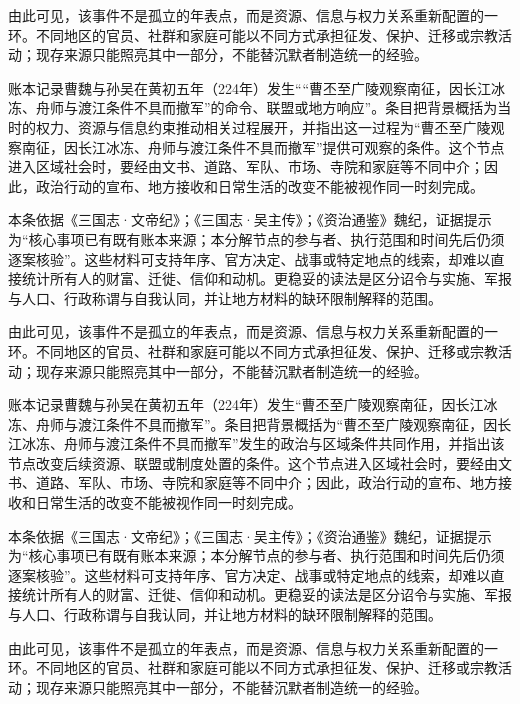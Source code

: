 由此可见，该事件不是孤立的年表点，而是资源、信息与权力关系重新配置的一环。不同地区的官员、社群和家庭可能以不同方式承担征发、保护、迁移或宗教活动；现存来源只能照亮其中一部分，不能替沉默者制造统一的经验。

账本记录曹魏与孙吴在黄初五年（224年）发生““曹丕至广陵观察南征，因长江冰冻、舟师与渡江条件不具而撤军”的命令、联盟或地方响应”。条目把背景概括为当时的权力、资源与信息约束推动相关过程展开，并指出这一过程为“曹丕至广陵观察南征，因长江冰冻、舟师与渡江条件不具而撤军”提供可观察的条件。这个节点进入区域社会时，要经由文书、道路、军队、市场、寺院和家庭等不同中介；因此，政治行动的宣布、地方接收和日常生活的改变不能被视作同一时刻完成。

本条依据《三国志·文帝纪》；《三国志·吴主传》；《资治通鉴》魏纪，证据提示为“核心事项已有既有账本来源；本分解节点的参与者、执行范围和时间先后仍须逐案核验”。这些材料可支持年序、官方决定、战事或特定地点的线索，却难以直接统计所有人的财富、迁徙、信仰和动机。更稳妥的读法是区分诏令与实施、军报与人口、行政称谓与自我认同，并让地方材料的缺环限制解释的范围。

由此可见，该事件不是孤立的年表点，而是资源、信息与权力关系重新配置的一环。不同地区的官员、社群和家庭可能以不同方式承担征发、保护、迁移或宗教活动；现存来源只能照亮其中一部分，不能替沉默者制造统一的经验。

账本记录曹魏与孙吴在黄初五年（224年）发生“曹丕至广陵观察南征，因长江冰冻、舟师与渡江条件不具而撤军”。条目把背景概括为“曹丕至广陵观察南征，因长江冰冻、舟师与渡江条件不具而撤军”发生的政治与区域条件共同作用，并指出该节点改变后续资源、联盟或制度处置的条件。这个节点进入区域社会时，要经由文书、道路、军队、市场、寺院和家庭等不同中介；因此，政治行动的宣布、地方接收和日常生活的改变不能被视作同一时刻完成。

本条依据《三国志·文帝纪》；《三国志·吴主传》；《资治通鉴》魏纪，证据提示为“核心事项已有既有账本来源；本分解节点的参与者、执行范围和时间先后仍须逐案核验”。这些材料可支持年序、官方决定、战事或特定地点的线索，却难以直接统计所有人的财富、迁徙、信仰和动机。更稳妥的读法是区分诏令与实施、军报与人口、行政称谓与自我认同，并让地方材料的缺环限制解释的范围。

由此可见，该事件不是孤立的年表点，而是资源、信息与权力关系重新配置的一环。不同地区的官员、社群和家庭可能以不同方式承担征发、保护、迁移或宗教活动；现存来源只能照亮其中一部分，不能替沉默者制造统一的经验。

